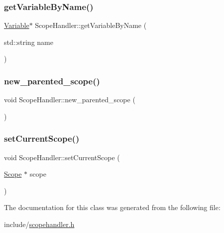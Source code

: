 \subsubsection{\texorpdfstring{get\+Variable\+By\+Name()}{getVariableByName()}}
{\footnotesize\ttfamily \hyperlink{classVariable}{Variable}$\ast$ Scope\+Handler\+::get\+Variable\+By\+Name (\begin{DoxyParamCaption}\item[{std\+::string}]{name }\end{DoxyParamCaption})}

\mbox{\label{classScopeHandler_a9d3db5f048c118eba258981cf04ffd05}} 
\subsubsection{\texorpdfstring{new\+\_\+parented\+\_\+scope()}{new\_parented\_scope()}}
{\footnotesize\ttfamily void Scope\+Handler\+::new\+\_\+parented\+\_\+scope (\begin{DoxyParamCaption}{ }\end{DoxyParamCaption})}

\mbox{\label{classScopeHandler_a7627747afbebc1dd7017da404fcabd3c}} 
\subsubsection{\texorpdfstring{set\+Current\+Scope()}{setCurrentScope()}}
{\footnotesize\ttfamily void Scope\+Handler\+::set\+Current\+Scope (\begin{DoxyParamCaption}\item[{\hyperlink{classScope}{Scope} $\ast$}]{scope }\end{DoxyParamCaption})}



The documentation for this class was generated from the following file\+:\begin{DoxyCompactItemize}
\item 
include/\hyperlink{scopehandler_8h}{scopehandler.\+h}\end{DoxyCompactItemize}
